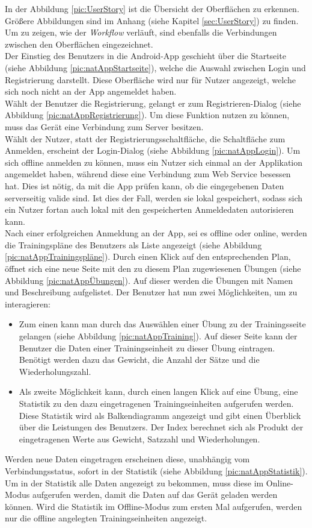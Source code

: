 In der Abbildung \ref{pic:UserStory} ist die Übersicht der Oberflächen zu erkennen. Größere Abbildungen sind im Anhang (siehe Kapitel \ref{sec:UserStory}) zu finden. Um zu zeigen, wie der \textit{Workflow} verläuft, sind ebenfalls die Verbindungen zwischen den Oberflächen eingezeichnet.\\
Der Einstieg des Benutzers in die \gls{Android}-\gls{App} geschieht über die Startseite (siehe Abbildung \ref{pic:natAppStartseite}), welche die Auswahl zwischen Login und Registrierung darstellt. Diese Oberfläche wird nur für Nutzer angezeigt, welche sich noch nicht an der \gls{App} angemeldet haben. \\ \newpage
Wählt der Benutzer die Registrierung, gelangt er zum Registrieren-Dialog (siehe Abbildung \ref{pic:natAppRegistrierung}). Um diese Funktion nutzen zu können, muss das Gerät eine Verbindung zum Server besitzen. \\
Wählt der Nutzer, statt der Registrierungsschaltfläche, die Schaltfläche zum Anmelden, erscheint der Login-Dialog (siehe Abbildung \ref{pic:natAppLogin}). Um sich offline anmelden zu können, muss ein Nutzer sich einmal an der Applikation angemeldet haben, während diese eine Verbindung zum Web Service besessen hat. Dies ist nötig, da mit die \gls{App} prüfen kann, ob die eingegebenen Daten serverseitig valide sind. Ist dies der Fall, werden sie lokal gespeichert, sodass sich ein Nutzer fortan auch lokal mit den gespeicherten Anmeldedaten autorisieren kann.\\
Nach einer erfolgreichen Anmeldung an der \gls{App}, sei es offline oder online, werden die Trainingspläne des Benutzers als Liste angezeigt (siehe Abbildung \ref{pic:natAppTrainingspläne}). Durch einen Klick auf den entsprechenden Plan, öffnet sich eine neue Seite mit den zu diesem Plan zugewiesenen Übungen (siehe Abbildung \ref{pic:natAppÜbungen}). Auf dieser werden die Übungen mit Namen und Beschreibung aufgelistet. Der Benutzer hat nun zwei Möglichkeiten, um zu interagieren: 
\begin{itemize}
\item Zum einen kann man durch das Auswählen einer Übung zu der Trainingsseite gelangen (siehe Abbildung \ref{pic:natAppTraining}). Auf dieser Seite kann der Benutzer die Daten einer Trainingseinheit zu dieser Übung eintragen. Benötigt werden dazu das Gewicht, die Anzahl der Sätze und die Wiederholungszahl.
\item Als zweite Möglichkeit kann, durch einen langen Klick auf eine Übung, eine Statistik zu den dazu eingetragenen Trainingseinheiten aufgerufen werden. Diese Statistik wird als Balkendiagramm angezeigt und gibt einen Überblick über die Leistungen des Benutzers. Der Index berechnet sich als Produkt der eingetragenen Werte aus Gewicht, Satzzahl und Wiederholungen.
\end{itemize}
Werden neue Daten eingetragen erscheinen diese, unabhängig vom Verbindungsstatus, sofort in der Statistik (siehe Abbildung \ref{pic:natAppStatistik}). Um in der Statistik alle Daten angezeigt zu bekommen, muss diese im Online-Modus aufgerufen werden, damit die Daten auf das Gerät geladen werden können. Wird die Statistik im Offline-Modus zum ersten Mal aufgerufen, werden nur die offline angelegten Trainingseinheiten angezeigt.

